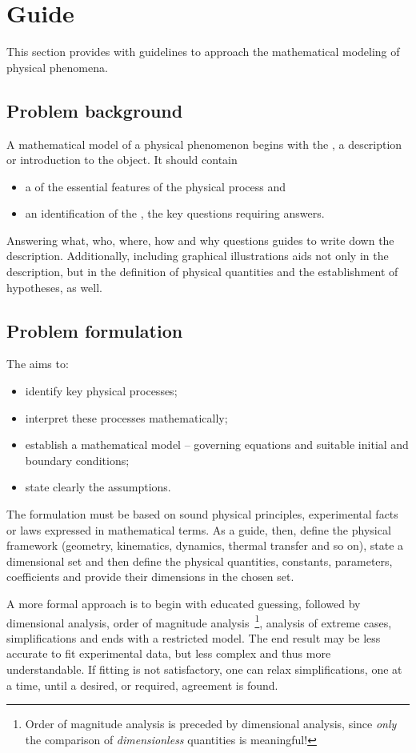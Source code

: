 \section{Guide}
This section provides with guidelines to approach the mathematical modeling of physical phenomena.


\subsection{Problem background}
A mathematical model of a physical phenomenon begins with the , a description or introduction to the object. It should contain 
\begin{itemize}
\item a  of the essential features of the physical process and 
\item an identification of the , the key questions requiring answers.
\end{itemize}

Answering what, who, where, how and why questions guides to write down the description. Additionally, including graphical illustrations aids not only in the description, but in the definition of physical quantities and the establishment of hypotheses, as well.


\subsection{Problem formulation}
The  aims to:
\begin{itemize}
\item identify key physical processes;
\item interpret these processes mathematically;
\item establish a mathematical model -- governing equations and suitable initial and boundary conditions;
\item state clearly the assumptions.
\end{itemize}

The formulation must be based on sound physical principles, experimental facts or laws expressed in mathematical terms. As a guide, then, define the physical framework (geometry, kinematics, dynamics, thermal transfer and so on), state a dimensional set and then define the physical quantities, constants, parameters, coefficients and provide their dimensions in the chosen set.

A more formal approach is to begin with educated guessing, followed by dimensional analysis, order of magnitude analysis~\footnote{Order of magnitude analysis is preceded by dimensional analysis, since \emph{only} the comparison of \emph{dimensionless} quantities is meaningful!}, analysis of extreme cases, simplifications and ends with a restricted model. The end result may be less accurate to fit experimental data, but less complex and thus more understandable. If fitting is not satisfactory, one can relax simplifications, one at a time, until a desired, or required, agreement is found.


